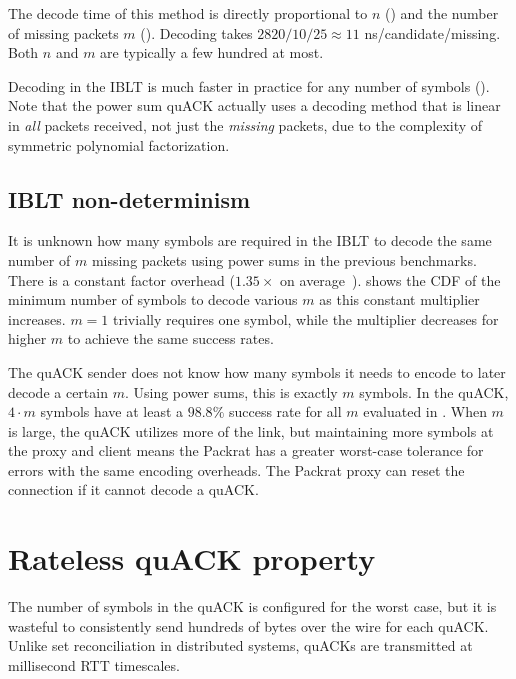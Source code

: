 The decode time of this method is directly proportional to $n$ ()
and the number of missing packets $m$ ().
Decoding takes $2820/10/25 \approx 11$ ns/candidate/missing.
Both $n$ and $m$ are typically a few hundred at most.

Decoding in the IBLT is much faster in practice for any number of symbols
(). Note that the power sum quACK actually uses a decoding
method that is linear in \textit{all} packets received, not just the \textit
{missing} packets, due to the complexity of symmetric polynomial
factorization.

\subsection{IBLT non-determinism}
\label{sec:quack:microbenchmarks:non-determinism}




It is unknown how many symbols are required in the IBLT to decode the same
number of $m$ missing packets using power sums in the previous benchmarks.
There is a constant factor overhead ($1.35\times$ on average~\cite
{yang2024practical}).
 shows the CDF of the minimum number of symbols to decode
various $m$ as this constant multiplier increases. $m=1$ trivially requires
one symbol, while the multiplier decreases for higher $m$ to achieve the same
success rates.

The quACK sender does not know how many symbols it needs to encode to later
decode a certain $m$. Using power sums, this is exactly $m$ symbols. In
the quACK, $4 \cdot m$ symbols have at least a $\!98.8\%$ success rate for
all $m$ evaluated in . When $m$ is large, the quACK utilizes more
of the link, but maintaining more symbols at the proxy and client means
the Packrat has a greater worst-case tolerance for errors with the same encoding
overheads. The Packrat proxy can reset the connection if it cannot decode a quACK.

\section{Rateless quACK property}
\label{sec:quack:rateless}

The number of symbols in the quACK is configured for the worst case, but it is
wasteful to consistently send hundreds of bytes over the wire for each quACK.
Unlike set reconciliation in distributed systems, quACKs are transmitted at
millisecond RTT timescales.

